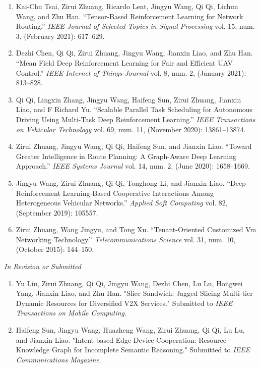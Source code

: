 \documentclass[letterpaper,11pt]{article}
\newcommand{\contentlength}{5.5in}
\begin{document}
\begin{tcolorbox}[flush right,breakable,colback=white,colframe=white,width=\contentlength]
\begin{enumerate}[itemsep=0mm]
			\item Kai-Chu Tsai, Zirui Zhuang, Ricardo Lent, Jingyu Wang, Qi Qi, Lichun Wang, and Zhu Han. “Tensor-Based Reinforcement Learning for Network Routing.” \textit{IEEE Journal of Selected Topics in Signal Processing} vol. 15, num. 3, (February 2021): 617–629.
			\item Dezhi Chen, Qi Qi, Zirui Zhuang, Jingyu Wang, Jianxin Liao, and Zhu Han. “Mean Field Deep Reinforcement Learning for Fair and Efficient UAV Control.” \textit{IEEE Internet of Things Journal} vol. 8, num. 2, (January 2021): 813–828.
			\item Qi Qi, Lingxin Zhang, Jingyu Wang, Haifeng Sun, Zirui Zhuang, Jianxin Liao, and F Richard Yu. “Scalable Parallel Task Scheduling for Autonomous Driving Using Multi-Task Deep Reinforcement Learning.” \textit{IEEE Transactions on Vehicular Technology} vol. 69, num. 11, (November 2020): 13861–13874.
			\item  Zirui Zhuang, Jingyu Wang, Qi Qi, Haifeng Sun, and Jianxin Liao. “Toward Greater Intelligence in Route Planning: A Graph-Aware Deep Learning Approach.” \textit{IEEE Systems Journal} vol. 14, num. 2, (June 2020): 1658–1669.
			\item Jingyu Wang, Zirui Zhuang, Qi Qi, Tonghong Li, and Jianxin Liao. “Deep Reinforcement Learning-Based Cooperative Interactions Among Heterogeneous Vehicular Networks.” \textit{Applied Soft Computing} vol. 82, (September 2019): 105557.
			\item Zirui Zhuang, Wang Jingyu, and Tong Xu. “Tenant-Oriented Customized Vm Networking Technology.” \textit{Telecommunications Science} vol. 31, num. 10, (October 2015): 144–150.
		\end{enumerate}
		
		\textit{In Revision or Submitted}
		\begin{enumerate}[itemsep=0mm,resume]
			\item Yu Liu, Zirui Zhuang, Qi Qi, Jingyu Wang, Dezhi Chen, Lu Lu, Hongwei Yang, Jianxin Liao, and Zhu Han. "Slice Sandwich: Jagged Slicing Multi-tier Dynamic Resources for Diversified V2X Services." Submitted to \textit{IEEE Transactions on Mobile Computing}.
			\item Haifeng Sun, Jingyu Wang, Huazheng Wang, Zirui Zhuang, Qi Qi, Lu Lu, and Jianxin Liao. "Intent-based Edge Device Cooperation: Resource Knowledge Graph for Incomplete Semantic Reasoning." Submitted to \textit{IEEE Communications Magazine}.
		\end{enumerate}
		

\end{tcolorbox}
\end{document}
